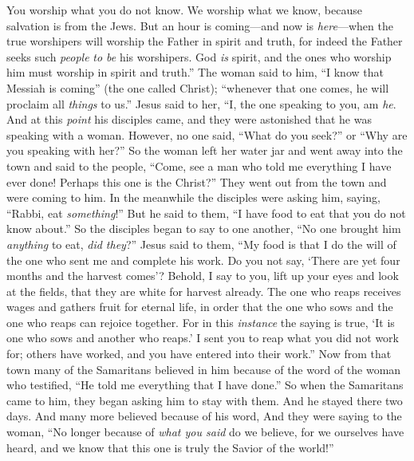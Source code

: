 \begin{biblechapter}
\verse You worship what you do not know. We worship what we know, because salvation is from the Jews.
\verse But an hour is coming—and now is \textit{here}—when the true worshipers will worship the Father in spirit and truth, for indeed the Father seeks such \textit{people} \textit{to be} his worshipers.
\verse God \textit{is} spirit, and the ones who worship him must worship in spirit and truth.”
\verse The woman said to him, “I know that Messiah is coming” (the one called Christ); “whenever that one comes, he will proclaim all \textit{things} to us.”
\verse Jesus said to her, “I, the one speaking to you, am \textit{he}.
 And at this \textit{point} his disciples came, and they were astonished that he was speaking with a woman. However, no one said, “What do you seek?” or “Why are you speaking with her?”
\verse So the woman left her water jar and went away into the town and said to the people,
\verse “Come, see a man who told me everything I have ever done! Perhaps this one is the Christ?”
\verse They went out from the town and were coming to him.
\verse In the meanwhile the disciples were asking him, saying, “Rabbi, eat \textit{something}!”
\verse But he said to them, “I have food to eat that you do not know about.”
\verse So the disciples began to say to one another, “No one brought him \textit{anything} to eat, \textit{did they}?”
\verse Jesus said to them, “My food is that I do the will of the one who sent me and complete his work.
\verse Do you not say, ‘There are yet four months and the harvest comes’? Behold, I say to you, lift up your eyes and look at the fields, that they are white for harvest already.
\verse The one who reaps receives wages and gathers fruit for eternal life, in order that the one who sows and the one who reaps can rejoice together.
\verse For in this \textit{instance} the saying is true, ‘It is one who sows and another who reaps.’
\verse I sent you to reap what you did not work for; others have worked, and you have entered into their work.”
 Now from that town many of the Samaritans believed in him because of the word of the woman who testified, “He told me everything that I have done.”
\verse So when the Samaritans came to him, they began asking him to stay with them. And he stayed there two days.
\verse And many more believed because of his word,
\verse And they were saying to the woman, “No longer because of \textit{what you said} do we believe, for we ourselves have heard, and we know that this one is truly the Savior of the world!”

\end{biblechapter}
